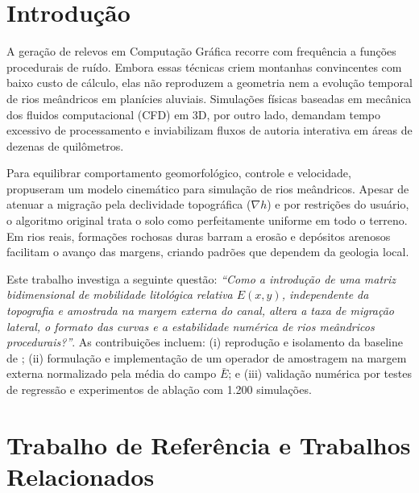 \documentclass[9pt,a4paper,twocolumn]{extarticle}
\newif\ifmostrarorientacoes
\newcommand{\orientacao}[1]{%
  \ifmostrarorientacoes
    \par\smallskip
    \noindent\fcolorbox{black!35}{black!4}{%
      \parbox{0.94\columnwidth}{\fontsize{7.4}{8.2}\selectfont\textbf{Orientação aos autores:} #1}%
    }%
    \par\smallskip
  \fi
}
\begin{document}
\section{Introdução}
\orientacao{Contextualize o problema de Computação Gráfica, explique sua relevância,
apresente o trabalho de referência e conduza o leitor até a questão específica investigada.
A introdução deve terminar com a questão/hipótese e as contribuições do artigo.}

A geração de relevos em Computação Gráfica recorre com frequência a funções procedurais de ruído. Embora essas técnicas criem montanhas convincentes com baixo custo de cálculo, elas não reproduzem a geometria nem a evolução temporal de rios meândricos em planícies aluviais. Simulações físicas baseadas em mecânica dos fluidos computacional (CFD) em 3D, por outro lado, demandam tempo excessivo de processamento e inviabilizam fluxos de autoria interativa em áreas de dezenas de quilômetros.

Para equilibrar comportamento geomorfológico, controle e velocidade, \textcite{paris2023meandering} propuseram um modelo cinemático para simulação de rios meândricos. Apesar de atenuar a migração pela declividade topográfica ($\nabla h$) e por restrições do usuário, o algoritmo original trata o solo como perfeitamente uniforme em todo o terreno. Em rios reais, formações rochosas duras barram a erosão e depósitos arenosos facilitam o avanço das margens, criando padrões que dependem da geologia local.

Este trabalho investiga a seguinte questão: \textit{``Como a introdução de uma matriz bidimensional de mobilidade litológica relativa $E(x,y)$, independente da topografia e amostrada na margem externa do canal, altera a taxa de migração lateral, o formato das curvas e a estabilidade numérica de rios meândricos procedurais?''}. As contribuições incluem: (i) reprodução e isolamento da baseline de \textcite{paris2023meandering}; (ii) formulação e implementação de um operador de amostragem na margem externa normalizado pela média do campo $\bar{E}$; e (iii) validação numérica por testes de regressão e experimentos de ablação com 1.200 simulações.

\section{Trabalho de Referência e Trabalhos Relacionados}
\orientacao{Apresente o artigo-base com precisão suficiente para que o leitor entenda
a técnica que será modificada. Discuta apenas a literatura necessária para posicionar
a proposta. Verifique trabalhos posteriores antes de afirmar novidade.}
\end{document}
